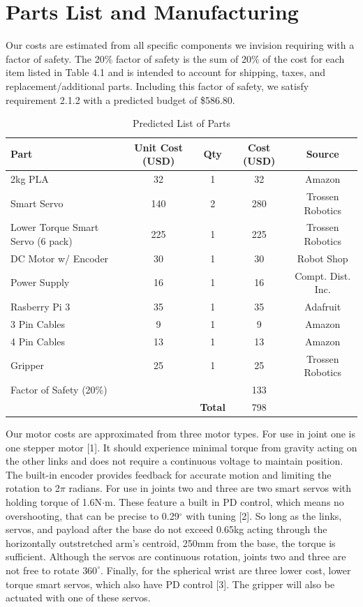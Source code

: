 \documentclass[12pt]{report}
\begin{document}
\section{Parts List and Manufacturing}
Our costs are estimated from all specific components we invision requiring with a factor of safety. The 20\% factor of safety is the sum of 20\% of the cost for each item listed in Table 4.1 and is intended to account for shipping, taxes, and replacement/additional parts. Including this factor of safety, we satisfy requirement 2.1.2 with a predicted budget of \$586.80. 

\begin{table}[htp]
  \center
  \caption{Predicted List of Parts}
  \label{table:costs}
  \begin{tabular}{C{3.5cm}cc|cc}
  \textbf{Part} & \textbf{Unit Cost (USD)} & \textbf{Qty} & \textbf{Cost (USD)} & \textbf{Source} \\ \hline
  2kg PLA & 32 & 1 & 32 & Amazon \\
  Smart Servo & 140 & 2 & 280 & Trossen Robotics \\
  Lower Torque Smart Servo (6 pack) & 225 & 1 & 225 & Trossen Robotics \\
  DC Motor w/ Encoder & 30 & 1 & 30 & Robot Shop \\
  Power Supply & 16 & 1 & 16 & Compt. Dist. Inc. \\
  Rasberry Pi 3 & 35 & 1 & 35 & Adafruit \\
  3 Pin Cables & 9 & 1 & 9 & Amazon \\
  4 Pin Cables & 13 & 1 & 13 & Amazon \\
  Gripper & 25 & 1 & 25 & Trossen Robotics \\
  Factor of Safety (20\%) & & & 133 & \\
  & & \textbf{Total} & 798 & \\
  \end{tabular}
\end{table}

Our motor costs are approximated from three motor types. For use in joint one is one stepper motor [1]. It should experience minimal torque from gravity acting on the other links and does not require a continuous voltage to maintain position. The built-in encoder provides feedback for accurate motion and limiting the rotation to 2$\pi$ radians. For use in joints two and three are two smart servos with holding torque of 1.6N$\cdot$m. These feature a built in PD control, which means no overshooting, that can be precise to 0.29\(^{\circ}\) with tuning [2]. So long as the links, servos, and payload after the base do not exceed 0.65kg acting through the horizontally outstretched arm’s centroid, 250mm from the base, the torque is sufficient. Although the servos are continuous rotation, joints two and three are not free to rotate \(360^{\circ}\). Finally, for the spherical wrist are three lower cost, lower torque smart servos, which also have PD control [3]. The gripper will also be actuated with one of these servos.\\
\end{document}
